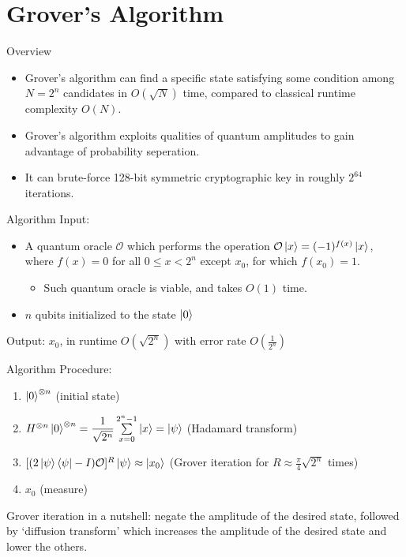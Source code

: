 \documentclass{beamer}
\begin{document}
    \section{Grover's Algorithm}

    \begin{frame}{Overview}
        \begin{itemize}
            \item Grover's algorithm can find a specific state satisfying some condition among $ N = 2^n$ candidates in $ O(\sqrt{N}) $ time, compared to classical runtime complexity $ O(N) $.
            \item Grover's algorithm exploits qualities of quantum amplitudes to gain advantage of probability seperation.
            \item It can brute-force 128-bit symmetric cryptographic key in roughly $ 2^{64} $ iterations.
        \end{itemize}
    \end{frame}

    \begin{frame}{Algorithm}
        Input:
        \begin{itemize}
            \item A quantum oracle $ \mathcal{O} $ which performs the operation $ \mathcal{O} \ket{x}  = (-1)^{f(x)} \ket{x}$, where $ f(x) = 0 $ for all $0 \leq x < 2^n $ except $ x_0 $, for which $ f(x_0) = 1 $.
            \begin{itemize}
                \item Such quantum oracle is viable, and takes $ O(1) $ time.
            \end{itemize}
            \item $ n $ qubits initialized to the state $ \ket{0} $
        \end{itemize}
        Output: $ x_0 $, in runtime $ O(\sqrt{2^n}) $ with error rate $ O(\frac{1}{2^n}) $
    \end{frame}

    \begin{frame}{Algorithm}
        Procedure:
        \begin{enumerate}
            \item $ \ket{0}^{\otimes n} $ (initial state)
            \item $ H^{\otimes n} \ket{0}^{\otimes n} = \dfrac{1}{\sqrt{2^n}} \sum\limits_{x=0}^{2^n-1}\ket{x} = \ket{\psi}$ (Hadamard transform)
            \item $ [(2 \ket{\psi} \bra{\psi} - I) \mathcal{O}]^R \ket{\psi} \approx \ket{x_0}  $ (Grover iteration for $ R \approx  \frac{\pi}{4}\sqrt{2^n} $ times)
            \item $ x_0 $ (measure)
        \end{enumerate}
        Grover iteration in a nutshell: negate the amplitude of the desired state, followed by `diffusion transform' which increases the amplitude of the desired state and lower the others.
    \end{frame}
\end{document}
